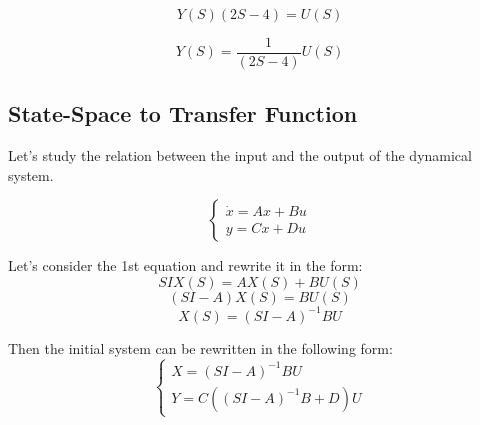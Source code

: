 \begin{equation}
    Y(S)(2S - 4) = U(S)
\end{equation}

\begin{equation}
    Y(S) = \frac{1}{(2S - 4)} U(S)
\end{equation}


\subsection{State-Space to Transfer Function}

Let's study the relation between the input and the output of the dynamical system. 

\[
\begin{cases}
    \dot x = Ax + Bu \\
    y = Cx + Du
\end{cases}
\] 

Let's consider the 1st equation and rewrite it in the form:
\[SI X(S) = AX(S) + BU(S)\]
\[(SI-A) X(S) = BU(S)\]
\[X(S) = (SI-A)^{-1}BU\]

Then the initial system can be rewritten in the following form:
\[
\begin{cases}
    X = (SI-A)^{-1}BU\\
    Y = C((SI-A)^{-1}B + D)U
\end{cases}
\]
